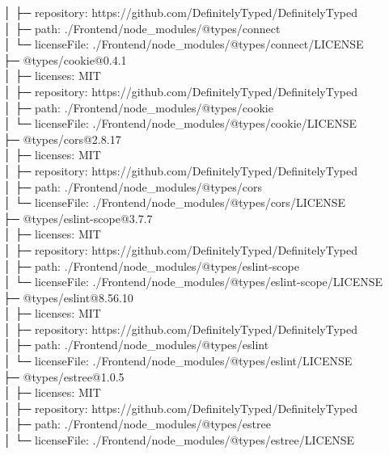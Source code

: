 \documentclass[
    paper=a4,
    twoside=false,
    parskip=half,
    listof=entryprefix,
    listof=totoc,
    index=totoc,
    bibliography=totoc,
    headsepline,
]{scrbook}
\begin{document}
    │  ├─ repository: https://github.com/DefinitelyTyped/DefinitelyTyped\\
    │  ├─ path: ./Frontend/node\_modules/@types/connect\\
    │  └─ licenseFile: ./Frontend/node\_modules/@types/connect/LICENSE\\
    ├─ @types/cookie@0.4.1\\
    │  ├─ licenses: MIT\\
    │  ├─ repository: https://github.com/DefinitelyTyped/DefinitelyTyped\\
    │  ├─ path: ./Frontend/node\_modules/@types/cookie\\
    │  └─ licenseFile: ./Frontend/node\_modules/@types/cookie/LICENSE\\
    ├─ @types/cors@2.8.17\\
    │  ├─ licenses: MIT\\
    │  ├─ repository: https://github.com/DefinitelyTyped/DefinitelyTyped\\
    │  ├─ path: ./Frontend/node\_modules/@types/cors\\
    │  └─ licenseFile: ./Frontend/node\_modules/@types/cors/LICENSE\\
    ├─ @types/eslint-scope@3.7.7\\
    │  ├─ licenses: MIT\\
    │  ├─ repository: https://github.com/DefinitelyTyped/DefinitelyTyped\\
    │  ├─ path: ./Frontend/node\_modules/@types/eslint-scope\\
    │  └─ licenseFile: ./Frontend/node\_modules/@types/eslint-scope/LICENSE\\
    ├─ @types/eslint@8.56.10\\
    │  ├─ licenses: MIT\\
    │  ├─ repository: https://github.com/DefinitelyTyped/DefinitelyTyped\\
    │  ├─ path: ./Frontend/node\_modules/@types/eslint\\
    │  └─ licenseFile: ./Frontend/node\_modules/@types/eslint/LICENSE\\
    ├─ @types/estree@1.0.5\\
    │  ├─ licenses: MIT\\
    │  ├─ repository: https://github.com/DefinitelyTyped/DefinitelyTyped\\
    │  ├─ path: ./Frontend/node\_modules/@types/estree\\
    │  └─ licenseFile: ./Frontend/node\_modules/@types/estree/LICENSE\\
\end{document}

